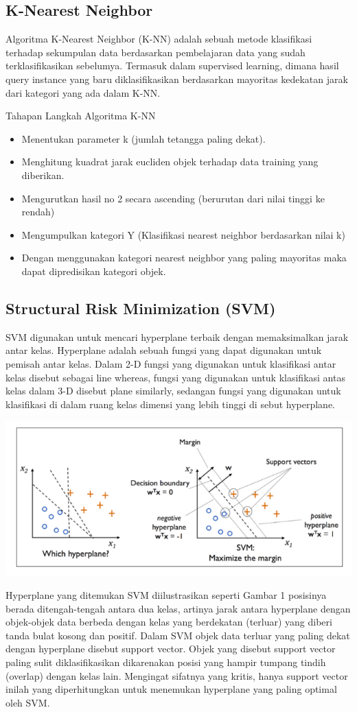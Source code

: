 \documentclass[conference]{IEEEtran}
\begin{document}
\subsection{K-Nearest Neighbor}
Algoritma K-Nearest Neighbor (K-NN) adalah sebuah metode klasifikasi terhadap sekumpulan data berdasarkan pembelajaran  data yang sudah terklasifikasikan sebelumya. Termasuk dalam supervised learning, dimana hasil query instance yang baru diklasifikasikan berdasarkan mayoritas kedekatan jarak dari kategori yang ada dalam K-NN.

 Tahapan Langkah Algoritma K-NN
\begin{itemize}
    \item Menentukan parameter k (jumlah tetangga paling dekat).
    \item Menghitung kuadrat jarak eucliden objek terhadap data training yang diberikan.
    \item Mengurutkan hasil no 2 secara ascending (berurutan dari nilai tinggi ke rendah)
    \item Mengumpulkan kategori Y (Klasifikasi nearest neighbor berdasarkan nilai k)
    \item Dengan menggunakan kategori nearest neighbor yang paling mayoritas maka dapat dipredisikan kategori objek.
\end{itemize}

\subsection{Structural Risk Minimization (SVM)}
SVM digunakan untuk mencari hyperplane terbaik dengan memaksimalkan jarak antar kelas. Hyperplane adalah sebuah fungsi yang dapat digunakan untuk pemisah antar kelas. Dalam 2-D fungsi yang digunakan untuk klasifikasi antar kelas disebut sebagai line whereas, fungsi yang digunakan untuk klasifikasi antas kelas dalam 3-D disebut plane similarly, sedangan fungsi yang digunakan untuk klasifikasi di dalam ruang kelas dimensi yang lebih tinggi di sebut hyperplane.

\begin{center}
\includegraphics[width=.4\textwidth]{picture/Gambar 3.3.1.png}
\end{center}

Hyperplane yang ditemukan SVM diilustrasikan seperti Gambar 1 posisinya berada ditengah-tengah antara dua kelas, artinya jarak antara hyperplane dengan objek-objek data berbeda dengan kelas yang berdekatan (terluar) yang diberi tanda bulat kosong dan positif. Dalam SVM objek data terluar yang paling dekat dengan hyperplane disebut support vector. Objek yang disebut support vector paling sulit diklasifikasikan dikarenakan posisi yang hampir tumpang tindih (overlap) dengan kelas lain. Mengingat sifatnya yang kritis, hanya support vector inilah yang diperhitungkan untuk menemukan hyperplane yang paling optimal oleh SVM.
\end{document}
